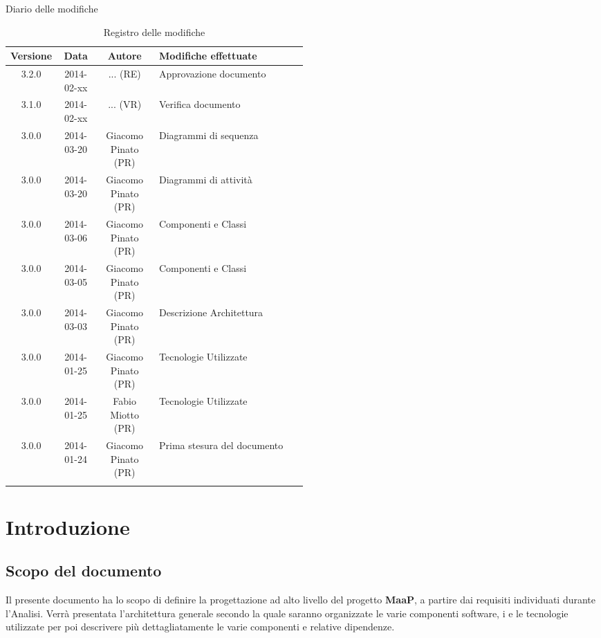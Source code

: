 
\newpage
Diario delle modifiche
\begin{center}
\begin{longtable}{|c|c|c|p{0.5\linewidth}|}
\toprule
\textbf{Versione} & \textbf{Data} & \textbf{Autore} & \textbf{Modifiche effettuate}\\

\midrule
3.2.0 & 2014-02-xx & ... (RE) & Approvazione documento\\
\midrule
3.1.0 & 2014-02-xx & ... (VR) & Verifica documento\\
\midrule
3.0.0 & 2014-03-20 & Giacomo Pinato (PR) & Diagrammi di sequenza\\
\midrule
3.0.0 & 2014-03-20 & Giacomo Pinato (PR) & Diagrammi di attività\\
\midrule
3.0.0 & 2014-03-06 & Giacomo Pinato (PR) & Componenti e Classi\\
\midrule
3.0.0 & 2014-03-05 & Giacomo Pinato (PR) & Componenti e Classi\\
\midrule
3.0.0 & 2014-03-03 & Giacomo Pinato (PR) & Descrizione Architettura\\
\midrule
3.0.0 & 2014-01-25 & Giacomo Pinato (PR) & Tecnologie Utilizzate\\
\midrule
3.0.0 & 2014-01-25 & Fabio Miotto (PR) & Tecnologie Utilizzate\\
\midrule
3.0.0 & 2014-01-24 & Giacomo Pinato (PR) & Prima stesura del documento\\

\bottomrule
\caption{Registro delle modifiche}
\label{tab:changelog}

\end{longtable}
\end{center}

\newpage
\tableofcontents

\newpage
\listoffigures %

\newpage
\section{Introduzione}
\subsection{Scopo del documento}
Il presente documento ha lo scopo di definire la progettazione ad alto livello del progetto \textbf{MaaP}, a partire dai requisiti individuati durante l'Analisi. Verrà presentata l'architettura generale secondo la quale saranno organizzate le varie componenti software, i  e le tecnologie utilizzate per poi descrivere più dettagliatamente le varie componenti e relative dipendenze.

